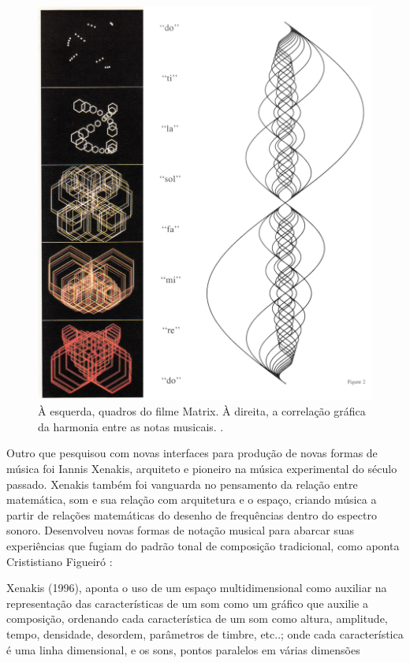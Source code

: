 \begin{figure}
    \caption{\label{matrix}À esquerda, quadros do filme Matrix. À direita, a correlação gráfica da harmonia entre as notas musicais.
.}
    
        \includegraphics[width=0.8\linewidth]{pictures/cap2/witney2}
    
\end{figure}


Outro que pesquisou com novas interfaces para produção de novas formas de música foi Iannis Xenakis, arquiteto e pioneiro na música experimental do século passado. Xenakis também foi vanguarda no pensamento da relação entre matemática, som e sua relação com arquitetura e o espaço, criando música a partir de relações matemáticas do desenho de frequências dentro do espectro sonoro. Desenvolveu novas formas de notação musical para abarcar suas experiências que fugiam do padrão tonal de composição tradicional, como aponta Crististiano Figueiró \citeyear{figueiro2013influencia}:

\begin{citacao}
Xenakis (1996), aponta o uso de um espaço multidimensional como auxiliar na representação das características de um som como um gráfico que auxilie a composição, ordenando cada característica de um som como altura, amplitude, tempo, densidade, desordem, parâmetros de timbre, etc..; onde cada característica é uma linha dimensional, e os sons, pontos paralelos em várias dimensões \cite{figueiro2013influencia}
\end{citacao}

